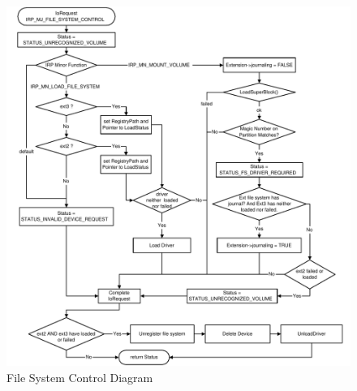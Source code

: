 \begin{figure}[H]
\begin{center}
\includegraphics[width=\linewidth]{./files/inc/pic/techRep_FsRec_FileSystemControl}
\caption{\label{fig:techRep_FsRec_FileSystemControl}File System Control Diagram}
\end{center}
\end{figure}


